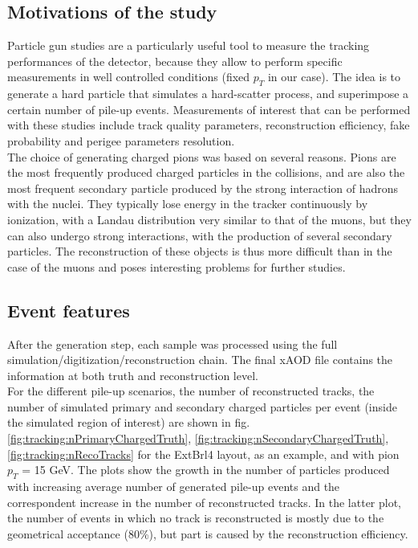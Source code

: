 \documentclass[a4paper,twoside,12pt]{article}
\begin{document}
\subsection{Motivations of the study}
Particle gun studies are a particularly useful tool to measure the tracking performances of the detector, because they allow to perform
specific measurements in well controlled conditions (fixed $p_{T}$ in our case). The idea is to generate a hard particle that
simulates a hard-scatter process, and superimpose a certain number of pile-up events. Measurements of interest that can be performed 
with these studies include track quality parameters, reconstruction efficiency, fake probability and perigee parameters resolution.\\

The choice of generating charged pions was based on several reasons. Pions are the most frequently
produced charged particles in the collisions, and are also the most frequent secondary particle produced by the strong interaction of hadrons with
the nuclei. They typically lose energy in the tracker continuously by ionization, with a Landau distribution very similar to that of the muons, but they can also undergo strong interactions, with the production of several secondary particles. The reconstruction of these objects
is thus more difficult than in the case of the muons and poses interesting problems for further studies.

\subsection{Event features}\label{subsec:tracking:eventFeatures}
After the generation step, each sample was processed using the full simulation/digitization/reconstruction chain. The final xAOD file contains the information at both
truth and reconstruction level. \\

For the different pile-up scenarios, the number of reconstructed tracks, the number of simulated primary and secondary charged particles per event
(inside the simulated region of interest) are shown in fig. \ref{fig:tracking:nPrimaryChargedTruth}, \ref{fig:tracking:nSecondaryChargedTruth}, \ref{fig:tracking:nRecoTracks} for the ExtBrl4 layout, as an example, and with pion $p_{T}$ = 15 GeV. The plots show the growth in the number of particles produced with increasing average number of generated pile-up events and
the correspondent increase in the number of reconstructed tracks. In the latter plot, the number of events in which no track is reconstructed is mostly due to the geometrical acceptance (80\%), but part is caused by the reconstruction efficiency. \\
\end{document}
